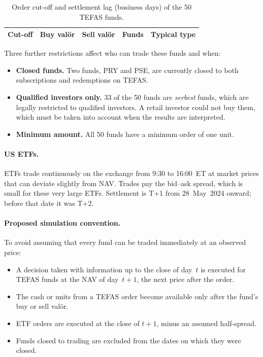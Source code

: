 \documentclass[11pt,a4paper]{article}
\begin{document}
\begin{table}[h]
\centering\small
\caption{Order cut-off and settlement lag (business days) of the 50 TEFAS funds.}
\label{tab:terms}
\begin{tabular}{@{}cccrl@{}}
\toprule
Cut-off & Buy valör & Sell valör & Funds & Typical type\\
\midrule
\bottomrule
\end{tabular}
\end{table}

Three further restrictions affect who can trade these funds and when:
\begin{itemize}
  \item \textbf{Closed funds.} Two funds, PRY and PSE, are currently closed to both
        subscriptions and redemptions on TEFAS.
  \item \textbf{Qualified investors only.} 33 of the 50 funds are \emph{serbest} funds,
        which are legally restricted to qualified investors. A retail investor could not
        buy them, which must be taken into account when the results are interpreted.
  \item \textbf{Minimum amount.} All 50 funds have a minimum order of one unit.
\end{itemize}

\paragraph{US ETFs.}
ETFs trade continuously on the exchange from 9:30 to 16:00~ET at market prices that can
deviate slightly from NAV. Trades pay the bid--ask spread, which is small for these very
large ETFs. Settlement is T+1 from 28~May~2024 onward; before that date it was T+2.

\paragraph{Proposed simulation convention.}
To avoid assuming that every fund can be traded immediately at an observed price:
\begin{itemize}
  \item A decision taken with information up to the close of day~$t$ is executed for
        TEFAS funds at the NAV of day~$t{+}1$, the next price after the order.
  \item The cash or units from a TEFAS order become available only after the fund's
        buy or sell valör.
  \item ETF orders are executed at the close of $t{+}1$, minus an assumed half-spread.
  \item Funds closed to trading are excluded from the dates on which they were closed.
\end{itemize}
\end{document}
